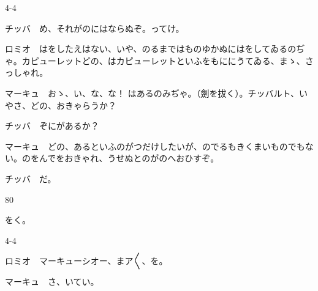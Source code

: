 \documentclass[tate,paper=b6j,jafontsize=9pt]{jlreq}
\begin{document}
\begin{azconvIndented}{4\zw}{-4\zw}

チッバ　め、それがのにはならぬぞ。ってけ。

ロミオ　はをしたえはない、いや、のるまではものゆかぬにはをしてゐるのぢゃ。カピューレットどの、はカピューレットといふをもににうてゐる、まゝ、さっしゃれ。

マーキュ　おゝ、い、な、な！ はあるのみぢゃ。（劍を拔く）。チッバルト、いやさ、どの、おきゃらうか？

チッバ　ぞにがあるか？

マーキュ　どの、あるといふのがつだけしたいが、のでるもきくまいものでもない。のをんでをおきゃれ、うせぬとのがのへおひすぞ。

チッバ　だ。

\end{azconvIndented}
\begin{azconvIndented}{8\zw}{0\zw}

をく。

\end{azconvIndented}
\begin{azconvIndented}{4\zw}{-4\zw}

ロミオ　マーキューシオー、まア{〳〵}、を。

マーキュ　さ、いてい。

\end{azconvIndented}
\end{document}
